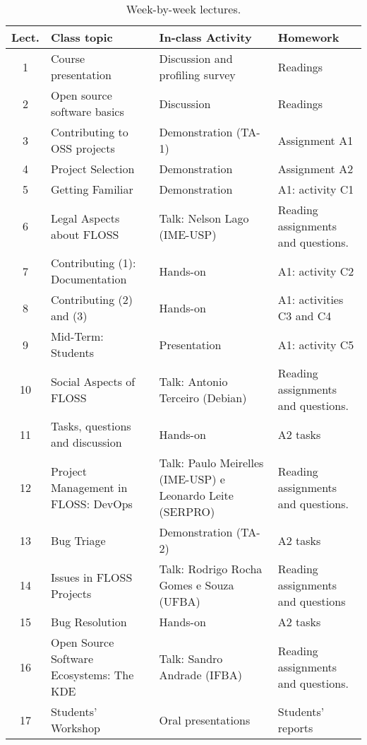 
\begin{table*}[htb]
\centering
\caption{Week-by-week lectures.} \label{tab:lectures}
\begin{tabular}{c|p{6.5cm}|p{4.25cm}|p{4.5cm}}
\hline
\textbf{Lect.} & \textbf{Class topic} &
\textbf{In-class Activity} & \textbf{Homework} \\ \hline 
1 &
Course presentation 
& Discussion and profiling survey
& Readings
\\
2 & 
Open source software basics 
& Discussion & Readings
\\
3 & 
Contributing to OSS projects 
& Demonstration (TA-1) & Assignment A1
\\
4 &
Project Selection
& Demonstration & Assignment A2
\\
5 &
Getting Familiar & Demonstration & A1: activity C1
\\
6 &
Legal Aspects about FLOSS & Talk: Nelson Lago (IME-USP)  & Reading assignments and questions.
\\
7 &
Contributing (1): Documentation & Hands-on & A1: activity C2
\\
8 &
Contributing (2) and (3) & Hands-on & A1: activities C3 and C4
\\
9 &
Mid-Term: Students & Presentation & A1: activity C5
\\
10 &
Social Aspects of FLOSS & Talk: Antonio Terceiro (Debian)
& Reading assignments and questions.
\\
11 &
Tasks, questions and discussion & Hands-on & A2 tasks
\\
12 &
Project Management in FLOSS: DevOps & Talk: Paulo Meirelles (IME-USP) e Leonardo Leite (SERPRO) 
& Reading assignments and questions.
\\
13 &
Bug Triage & Demonstration (TA-2) & A2 tasks
\\
14 &
Issues in FLOSS Projects & Talk: Rodrigo Rocha Gomes e Souza (UFBA) 
& Reading assignments and questions\\
15 &
Bug Resolution & Hands-on &  A2 tasks 
\\
16 & 
Open Source Software Ecosystems: The KDE 
& Talk: Sandro Andrade (IFBA) 
& Reading assignments and questions.
\\ 
17 &
Students' Workshop & Oral presentations & Students' reports
\\
\hline
\end{tabular}
\end{table*}

